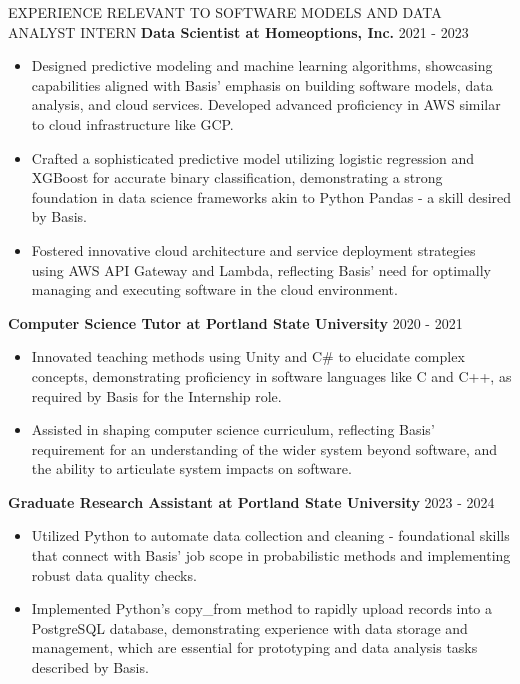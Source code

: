 \documentclass{resume}
\begin{document}
\begin{rSection}{EXPERIENCE RELEVANT TO SOFTWARE MODELS AND DATA ANALYST INTERN}
\textbf{Data Scientist at Homeoptions, Inc.} \hfill 2021 - 2023 \\
\begin{itemize}
    \item Designed predictive modeling and machine learning algorithms, showcasing capabilities aligned with Basis' emphasis on building software models, data analysis, and cloud services. Developed advanced proficiency in AWS similar to cloud infrastructure like GCP.
    \item Crafted a sophisticated predictive model utilizing logistic regression and XGBoost for accurate binary classification, demonstrating a strong foundation in data science frameworks akin to Python Pandas - a skill desired by Basis.
    \item Fostered innovative cloud architecture and service deployment strategies using AWS API Gateway and Lambda, reflecting Basis' need for optimally managing and executing software in the cloud environment.
\end{itemize}

\textbf{Computer Science Tutor at Portland State University} \hfill 2020 - 2021 \\
\begin{itemize}
    \item Innovated teaching methods using Unity and C# to elucidate complex concepts, demonstrating proficiency in software languages like C and C++, as required by Basis for the Internship role.
    \item Assisted in shaping computer science curriculum, reflecting Basis' requirement for an understanding of the wider system beyond software, and the ability to articulate system impacts on software.
\end{itemize}

\textbf{Graduate Research Assistant at Portland State University} \hfill 2023 - 2024 \\
\begin{itemize}
    \item Utilized Python to automate data collection and cleaning - foundational skills that connect with Basis' job scope in probabilistic methods and implementing robust data quality checks.
    \item Implemented Python's copy\_from method to rapidly upload records into a PostgreSQL database, demonstrating experience with data storage and management, which are essential for prototyping and data analysis tasks described by Basis.
\end{itemize}
\end{rSection}
\end{document}
